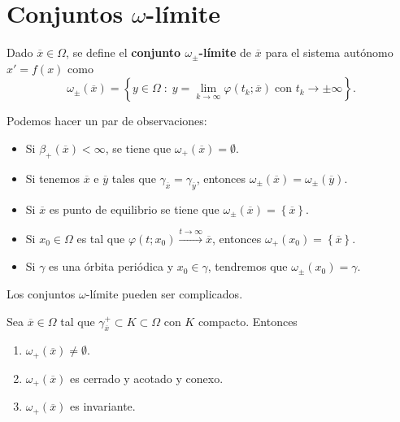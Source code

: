 \section{Conjuntos $\displaystyle \omega  $-límite}
\begin{definition}
Dado $\displaystyle \overline{x}\in \Omega  $, se define el \textbf{conjunto $\displaystyle \omega_{\pm} $-límite} de $\displaystyle \overline{x} $ para el sistema autónomo $\displaystyle x' = f\left(x\right) $ como
\[\omega_{\pm}\left(\overline{x}\right) = \left\{ y \in \Omega \; : \; y = \lim_{k \to \infty}\varphi\left(t_{k}; \overline{x}\right) \; \text{con }t_{k}\to \pm \infty\right\}  .\]
\end{definition}
\begin{observation}
Podemos hacer un par de observaciones:
\begin{itemize}
\item Si $\displaystyle \beta_{+}\left(\overline{x}\right)<\infty $, se tiene que $\displaystyle \omega_{+}\left(\overline{x}\right)=\emptyset $. 
\item Si tenemos $\displaystyle \overline{x} $ e $\displaystyle \overline{y} $ tales que $\displaystyle \gamma_{\overline{x}}=\gamma_{\overline{y}} $, entonces $\displaystyle \omega_{\pm}\left(\overline{x}\right)=\omega_{\pm}\left(\overline{y}\right) $. 
\item Si $\displaystyle \overline{x} $ es punto de equilibrio se tiene que $\displaystyle \omega_{\pm}\left(\overline{x}\right)= \left\{ \overline{x}\right\}  $. 
\item Si $\displaystyle x_{0}\in \Omega  $ es tal que $\displaystyle \varphi\left(t; x_{0}\right)\xrightarrow{t \to \infty}\overline{x} $, entonces $\displaystyle \omega_{+ }\left(x_{0}\right)= \left\{ \overline{x}\right\}  $. 
\item Si $\displaystyle \gamma  $ es una órbita periódica y $\displaystyle x_{0}\in \gamma  $, tendremos que $\displaystyle \omega_{\pm}\left(x_{0}\right)=\gamma  $. 
\end{itemize}
\end{observation}
\begin{observation}
Los conjuntos $\displaystyle \omega  $-límite pueden ser complicados. 
\end{observation}
\begin{prop}
Sea $\displaystyle \overline{x}\in \Omega  $ tal que $\displaystyle \gamma^{+}_{\overline{x}}\subset K\subset \Omega  $ con $\displaystyle K $ compacto. Entonces
\begin{enumerate}
\item $\displaystyle \omega_{+}\left(\overline{x}\right)\neq \emptyset $. 
\item $\displaystyle \omega_{+}\left(\overline{x}\right) $ es cerrado y acotado y conexo. 
\item $\displaystyle \omega_{+ }\left(\overline{x}\right) $ es invariante. 
\end{enumerate}
\end{prop}
